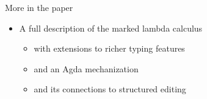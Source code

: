 \begin{frame}
  
\end{frame}

\begin{frame}{More in the paper}
  \begin{itemize}
    \item A full description of the marked lambda calculus

      \pause
      \begin{itemize}
        \item with extensions to richer typing features
        \item and an Agda mechanization
        \item and its connections to structured editing
      \end{itemize}
  \end{itemize}
\end{frame}
